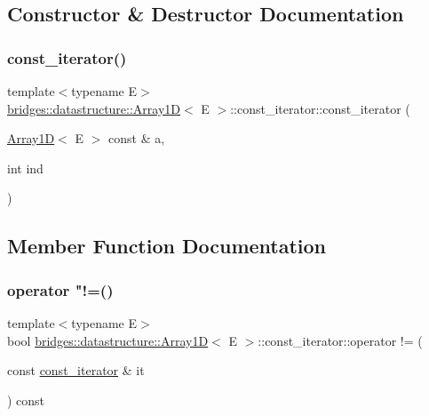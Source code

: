 \subsection{Constructor \& Destructor Documentation}
\mbox{\label{classbridges_1_1datastructure_1_1_array1_d_1_1const__iterator_a1ea421b46a3f0907190a91752e1f5b32}} 
\subsubsection{\texorpdfstring{const\_iterator()}{const\_iterator()}}
{\footnotesize\ttfamily template$<$typename E$>$ \\
\mbox{\hyperlink{classbridges_1_1datastructure_1_1_array1_d}{bridges\+::datastructure\+::\+Array1D}}$<$ E $>$\+::const\+\_\+iterator\+::const\+\_\+iterator (\begin{DoxyParamCaption}\item[{\mbox{\hyperlink{classbridges_1_1datastructure_1_1_array1_d}{Array1D}}$<$ E $>$ const \&}]{a,  }\item[{int}]{ind }\end{DoxyParamCaption})\hspace{0.3cm}{\ttfamily [inline]}}



\subsection{Member Function Documentation}
\mbox{\label{classbridges_1_1datastructure_1_1_array1_d_1_1const__iterator_a4a669671943605345dd6517b0cb07508}} 
\subsubsection{\texorpdfstring{operator "!=()}{operator !=()}}
{\footnotesize\ttfamily template$<$typename E$>$ \\
bool \mbox{\hyperlink{classbridges_1_1datastructure_1_1_array1_d}{bridges\+::datastructure\+::\+Array1D}}$<$ E $>$\+::const\+\_\+iterator\+::operator != (\begin{DoxyParamCaption}\item[{const \mbox{\hyperlink{classbridges_1_1datastructure_1_1_array1_d_1_1const__iterator}{const\+\_\+iterator}} \&}]{it }\end{DoxyParamCaption}) const\hspace{0.3cm}{\ttfamily [inline]}}

